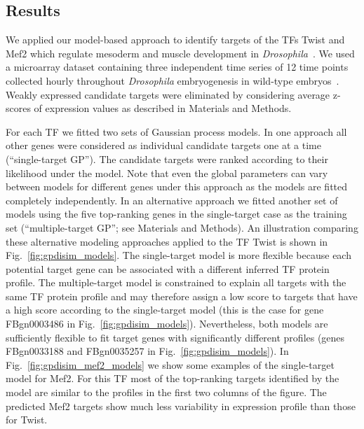 \documentclass{pnastwo}
\begin{document}
\begin{article}
\section{Results}

We applied our model-based approach to identify targets of the TFs
Twist and Mef2 which regulate mesoderm and muscle development in
\emph{Drosophila}~\cite{Sandmann2007,Zinzen2009}. We used a microarray dataset
containing three independent time series of 12 time points collected
hourly throughout \emph{Drosophila} embryogenesis in wild-type
embryos~\cite{Tomancak2002}.  Weakly expressed candidate targets were eliminated by 
considering average z-scores of expression values as described in
Materials and Methods.

For each TF we fitted two sets of Gaussian process models. In one
approach all other genes were considered as individual candidate targets one at a
time (``single-target GP'').  The candidate targets were ranked
according to their likelihood under the model.  Note that even the global
parameters can vary between models for different genes under this approach as the models
are fitted completely independently. In an alternative approach we fitted another set of models using the five
top-ranking genes in the single-target case as the training set (``multiple-target GP''; see
Materials and Methods).  An illustration comparing these alternative
modeling approaches applied to the TF Twist is shown in Fig.~\ref{fig:gpdisim_models}. The
single-target model is more flexible because each
potential target gene can be associated with a different inferred TF
protein profile. The multiple-target model is constrained to explain
all targets with the same TF protein profile and may therefore assign
a low score to targets that have a high score according to the
single-target model (this is the case for gene FBgn0003486 in
Fig.~\ref{fig:gpdisim_models}). Nevertheless, both models are
sufficiently flexible to fit target genes with significantly different
profiles (genes FBgn0033188 and FBgn0035257 in
Fig.~\ref{fig:gpdisim_models}).
In Fig.~\ref{fig:gpdisim_mef2_models} we show some examples of the
single-target model for Mef2.  For this TF most of the
top-ranking targets identified by the model are similar to the
profiles in the first two columns of the figure.
The predicted Mef2 targets show much less variability in expression
profile than those for Twist.


\end{article}
\end{document}
